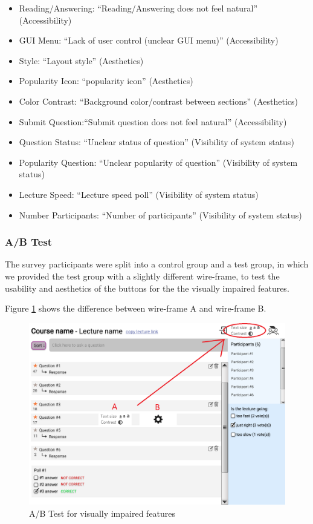 \documentclass{article}
\begin{document}
\begin{itemize}
    \item Reading/Answering: ``Reading/Answering does not feel natural'' (Accessibility)
    \item GUI Menu: ``Lack of user control (unclear GUI menu)'' (Accessibility)
    \item Style: ``Layout style'' (Aesthetics)
    \item Popularity Icon: ``popularity icon'' (Aesthetics)
    \item Color Contrast: ``Background color/contrast between sections'' (Aesthetics)
    \item Submit Question:``Submit question does not feel natural'' (Accessibility)
    \item Question Status: ``Unclear status of question'' (Visibility of system status)
    \item Popularity Question: ``Unclear popularity of question'' (Visibility of system status)
    \item Lecture Speed: ``Lecture speed poll'' (Visibility of system status) 
    \item Number Participants: ``Number of participants'' (Visibility of system status)
\end{itemize}


\subsubsection{A/B Test\label{abtest}}

The survey participants were split into a control group and a test group, in which we provided the test group
with a slightly different wire-frame, to test the usability and aesthetics of the buttons for the the visually impaired features.

Figure \ref{ABGui} shows the difference between wire-frame A and wire-frame B.

\begin{figure}[ht]
    \centering
    \includegraphics[width=\textwidth]{wireframe_AB.png}
    \caption{A/B Test for visually impaired features}
    \label{ABGui}
\end{figure}
\end{document}
